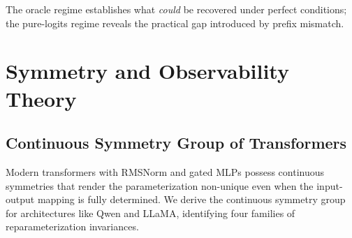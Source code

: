 \documentclass{article}
\begin{document}
The oracle regime establishes what \emph{could} be recovered under perfect conditions; the pure-logits regime reveals the practical gap introduced by prefix mismatch.

\section{Symmetry and Observability Theory}
\label{sec:theory}

\subsection{Continuous Symmetry Group of Transformers}
\label{sec:symmetry}

Modern transformers with RMSNorm and gated MLPs possess continuous symmetries that render the parameterization non-unique even when the input-output mapping is fully determined. We derive the continuous symmetry group for architectures like Qwen and LLaMA, identifying four families of reparameterization invariances.
\end{document}
